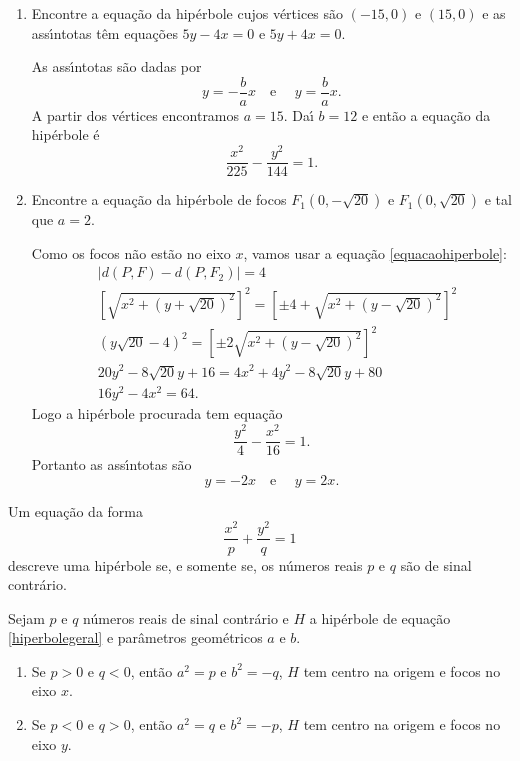 \begin{exemplos}
  \begin{enumerate}
    \item Encontre a equa\c{c}\~ao da hip\'erbole cujos v\'ertices s\~ao $(-15,0)$ e $(15,0)$ e as ass{\'\i}ntotas t\^em equa\c{c}\~oes $5y - 4x = 0$ e $5y + 4x = 0$.
    \begin{solucao}
      As ass{\'\i}ntotas s\~ao dadas por
      \[
        y = -\dfrac{b}{a}x \quad\mbox{e }\quad y = \dfrac{b}{a}x.
      \]
      A partir dos v\'ertices encontramos $a = 15$. Da{\'\i} $b = 12$ e ent\~ao a equa\c{c}\~ao da hip\'erbole \'e
      \[
        \dfrac{x^2}{225} - \dfrac{y^2}{144} = 1.
      \]
    \end{solucao}
    \item Encontre a equa\c{c}\~ao da hip\'erbole de focos $F_1(0,-\sqrt{20})$ e $F_1(0,\sqrt{20})$ e tal que $a = 2$.
    \begin{solucao}
      Como os focos n\~ao est\~ao no eixo $x$, vamos usar a equa\c{c}\~ao \eqref{equacaohiperbole}:
      \begin{align*}
        &\mid d(P,F) - d(P,F_2)\mid = 4\\
        &\left[\sqrt{x^2 + (y + \sqrt{20})^2}\right]^2 = \left[\pm 4 + \sqrt{x^2 + (y - \sqrt{20})^2}\right]^2\\
        &(y\sqrt{20} - 4)^2 = \left[\pm 2\sqrt{x^2 + (y - \sqrt{20})^2}\right]^2\\
        &20y^2 - 8\sqrt{20}y + 16 = 4x^2 + 4y^2 - 8\sqrt{20}y + 80\\
        &16y^2 - 4x^2 = 64.
      \end{align*}
      Logo a hip\'erbole procurada tem equa\c{c}\~ao
      \[
        \dfrac{y^2}{4} - \dfrac{x^2}{16} = 1.
      \]
      Portanto as ass{\'\i}ntotas s\~ao
      \[
        y = -2x \quad\mbox{e }\quad y = 2x.
      \]
    \end{solucao}
  \end{enumerate}
\end{exemplos}

\begin{proposicao}
  Um equa\c{c}\~ao da forma
  \begin{equation}\label{hiperbolegeral}
    \dfrac{x^2}{p} + \dfrac{y^2}{q} = 1
  \end{equation}
  descreve uma hip\'erbole se, e somente se, os n\'umeros reais $p$ e $q$ s\~ao de sinal contr\'ario.
\end{proposicao}

\begin{corolario}
  Sejam $p$ e $q$ n\'umeros reais de sinal contr\'ario e $H$ a hip\'erbole de equa\c{c}\~ao \eqref{hiperbolegeral} e par\^ametros geom\'etricos $a$ e $b$.
  \begin{enumerate}
    \item Se $p > 0$ e $q < 0$, ent\~ao $a^2 = p$ e $b^2 = -q$, $H$ tem centro na origem e focos no eixo $x$.
    \item Se $p < 0$ e $q > 0$, ent\~ao $a^2 = q$ e $b^2 = -p$, $H$ tem centro na origem e focos no eixo $y$.
  \end{enumerate}
\end{corolario}


